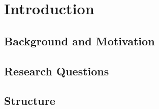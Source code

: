 \documentclass[12pt,a4paper]{article}
\begin{document}
	\tableofcontents
	






\newpage


\setcounter{page}{1} 
%

%
%
%
%
%
%
%
%
\newpage
\section{Introduction} \label{section:introduction}


\subsection{Background and Motivation} 


\subsection{Research Questions}


\subsection{Structure}






%
%
%
%
%
%
%
%
\newpage
\end{document}
